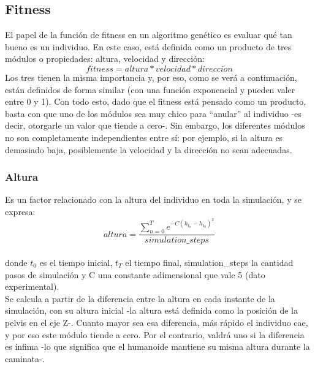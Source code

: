 \documentclass{article}
\begin{document}
\subsection{Fitness}

El papel de la funci\'on de fitness en un algoritmo gen\'etico es evaluar qu\'e tan bueno es un individuo. En este caso, est\'a definida como un producto de tres m\'odulos o propiedades: altura, velocidad y direcci\'on:
\begin{equation}
  fitness = altura * velocidad * direcci\acute{o}n
\end{equation}
Los tres tienen la misma importancia y, por eso, como se ver\'a a continuaci\'on, est\'an definidos de forma similar (con una funci\'on exponencial y pueden valer entre 0 y 1). Con todo esto, dado que el fitness est\'a pensado como un producto, basta con que uno de los m\'odulos sea muy chico para  ``anular'' al individuo -es decir, otorgarle un valor que tiende a cero-. Sin embargo, los diferentes m\'odulos no son completamente independientes entre s\'i: por ejemplo, si la altura es demasiado baja, posiblemente la velocidad y la direcci\'on no sean adecuadas. \\

\subsubsection{Altura}
\label{altura}
Es un factor relacionado con la altura del individuo en toda la simulaci\'on, y se expresa:\\
\begin{equation}
  altura = \frac{\sum_{n=0}^{T} {e^{-C( h_{t_{n}} - h_{t_{0}} )^2  }}}{simulation\_steps}
\end{equation}
\\ donde $t_{0}$ es el tiempo inicial, $t_{T}$ el tiempo final, simulation\_steps la cantidad pasos de simulaci\'on y C una constante adimensional que vale 5 (dato experimental).
\\
Se calcula a partir de la diferencia entre la altura en cada instante de la simulaci\'on, con su altura inicial -la altura est\'a definida como la posici\'on de la pelvis en el eje Z-. Cuanto mayor sea esa diferencia, m\'as r\'apido el individuo cae, y por eso este m\'odulo tiende a cero. Por el contrario, valdr\'a uno si la diferencia es \'infima -lo que significa que el humanoide mantiene su misma altura durante la caminata-.\\
\end{document}
